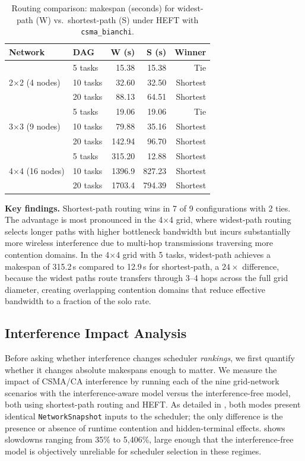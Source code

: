\documentclass[conference]{IEEEtran}
\begin{document}
\begin{table}[t]
\centering
\caption{Routing comparison: makespan (seconds) for widest-path (W) vs.\
shortest-path (S) under HEFT with \texttt{csma\_bianchi}.}
\label{tab:routing}
\begin{tabular}{@{}llrrr@{}}
\toprule
\textbf{Network} & \textbf{DAG} & \textbf{W (s)} & \textbf{S (s)} & \textbf{Winner} \\
\midrule
\multirow{3}{*}{2$\times$2 (4 nodes)}
  & 5 tasks   & 15.38  & 15.38  & Tie \\
  & 10 tasks  & 32.60  & 32.50  & Shortest \\
  & 20 tasks  & 88.13  & 64.51  & Shortest \\
\midrule
\multirow{3}{*}{3$\times$3 (9 nodes)}
  & 5 tasks   & 19.06  & 19.06  & Tie \\
  & 10 tasks  & 79.88  & 35.16  & Shortest \\
  & 20 tasks  & 142.94 & 96.70  & Shortest \\
\midrule
\multirow{3}{*}{4$\times$4 (16 nodes)}
  & 5 tasks   & 315.20 & 12.88  & Shortest \\
  & 10 tasks  & 1396.9 & 827.23 & Shortest \\
  & 20 tasks  & 1703.4 & 794.39 & Shortest \\
\bottomrule
\end{tabular}
\end{table}

\textbf{Key findings.}
Shortest-path routing wins in 7 of 9 configurations with 2 ties.  The
advantage is most pronounced in the 4$\times$4 grid, where widest-path
routing selects longer paths with higher bottleneck bandwidth but incurs
substantially more wireless interference due to multi-hop transmissions
traversing more contention domains.  In the 4$\times$4 grid with 5 tasks,
widest-path achieves a makespan of 315.2\,s compared to 12.9\,s for
shortest-path, a $24\times$ difference, because the widest paths route
transfers through 3--4 hops across the full grid diameter, creating
overlapping contention domains that reduce effective bandwidth to a
fraction of the solo rate.


\subsection{Interference Impact Analysis}
\label{sec:interference_eval}

Before asking whether interference changes scheduler \emph{rankings},
we first quantify whether it changes absolute makespans enough to
matter.  We measure the impact of CSMA/CA interference by running each
of the nine grid-network scenarios with the interference-aware model
versus the interference-free model, both using shortest-path routing
and HEFT.  As detailed in \Cref{sec:scheduler_info}, both modes
present identical \texttt{NetworkSnapshot} inputs to the scheduler;
the only difference is the presence or absence of runtime contention
and hidden-terminal effects.  \Cref{tab:interference} shows slowdowns
ranging from 35\% to 5{,}406\%, large enough that the
interference-free model is objectively unreliable for scheduler
selection in these regimes.
\end{document}
